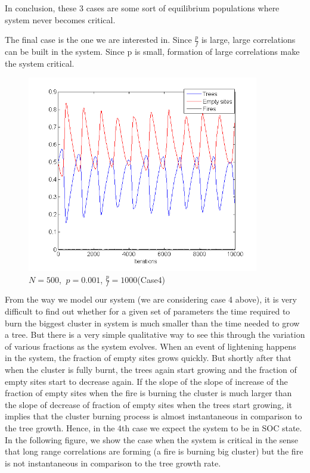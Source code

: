 \documentclass[11pt]{article}
\begin{document}
In conclusion, these 3 cases are some sort of equilibrium populations where system never becomes critical.

The final case is the one we are interested in. Since $\frac{p}{f}$ is large, large correlations can be built in the system. Since p is small, formation of large correlations make the system critical.
\begin{figure}[H]
\centering
\includegraphics[width=0.9\textwidth,keepaspectratio=true,]{Pictures/case4_size500_10000iter_p_0point001_ratio_1000.png}
\caption{$N=500$, $\ p=0.001$, $\frac{p}{f}=1000$(Case4)}
\end{figure}

From the way we model our system (we are considering case 4 above), it is very difficult to find out whether for a given set of parameters the time required to burn the biggest cluster in system is much smaller than the time needed to grow a tree. But there is a very simple qualitative way to see this through the variation of various fractions as the system evolves. When an event of lightening happens in the system, the fraction of empty sites grows quickly. But shortly after that when the cluster is fully burnt, the trees again start growing and the fraction of empty sites start to decrease again. If the slope of the slope of increase of the fraction of empty sites when the fire is burning the cluster is much larger than the slope of decrease of fraction of empty sites when the trees start growing, it implies that the cluster burning process is almost instantaneous in comparison to the tree growth. Hence, in the 4th case we expect the system to be in SOC state. In the following figure, we show the case when the system is critical in the sense that long range correlations are forming (a fire is burning big cluster) but the fire is not instantaneous in comparison to the tree growth rate.
\end{document}
